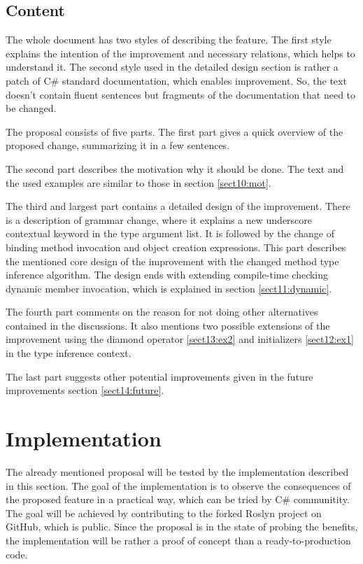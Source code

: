 \subsection{Content}

The whole document has two styles of describing the feature. 
The first style explains the intention of the improvement and necessary relations, which helps to understand it. 
The second style used in the detailed design section is rather a patch of C\# standard documentation, which enables improvement. 
So, the text doesn’t contain fluent sentences but fragments of the documentation that need to be changed.
\par
The proposal consists of five parts. 
The first part gives a quick overview of the proposed change, summarizing it in a few sentences.
\par
The second part describes the motivation why it should be done. The text
and the used examples are similar to those in section \ref{sect10:mot}.
\par
The third and largest part contains a detailed design of the improvement. 
There is a description of grammar change, where it explains a new underscore contextual keyword in the type argument list. 
It is followed by the change of binding method invocation and object creation expressions. 
This part describes the mentioned core design of the improvement with the changed method type inference algorithm. 
The design ends with extending compile-time checking dynamic member invocation, which is explained in section \ref{sect11:dynamic}.
\par
The fourth part comments on the reason for not doing other alternatives contained in the discussions. 
It also mentions two possible extensions of the improvement using the diamond operator \ref{sect13:ex2} and initializers \ref{sect12:ex1} in the type inference context.
\par
The last part suggests other potential improvements given in the future improvements section \ref{sect14:future}.


\section{Implementation}

The already mentioned proposal will be tested by the implementation described in this section. 
The goal of the implementation is to observe the consequences of the proposed feature in a practical way, which can be tried by C\# communitity. 
The goal will be achieved by contributing to the forked Roslyn project on GitHub, which is public. 
Since the proposal is in the state of probing the benefits, the implementation will be rather a proof of concept than a ready-to-production code.

